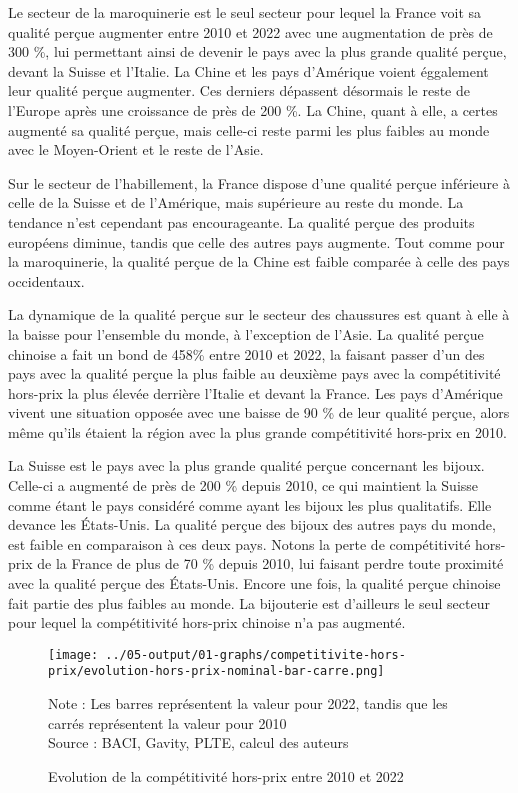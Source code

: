 \documentclass[french,10pt,a4paper]{article}
\begin{document}
Le secteur de la maroquinerie est le seul secteur pour lequel la France voit sa qualité perçue augmenter entre 2010 et 2022 avec une augmentation de près de 300 \%, lui permettant ainsi de devenir le pays avec la plus grande qualité perçue, devant la Suisse et l'Italie. La Chine et les pays d'Amérique voient éggalement leur qualité perçue augmenter. Ces derniers dépassent désormais le reste de l'Europe après une croissance de près de 200 \%. La Chine, quant à elle, a certes augmenté sa qualité perçue, mais celle-ci reste parmi les plus faibles au monde avec le Moyen-Orient et le reste de l'Asie.

Sur le secteur de l'habillement, la France dispose d'une qualité perçue inférieure à celle de la Suisse et de l'Amérique, mais supérieure au reste du monde. La tendance n'est cependant pas encourageante. La qualité perçue des produits européens diminue, tandis que celle des autres pays augmente. Tout comme pour la maroquinerie, la qualité perçue de la Chine est faible comparée à celle des pays occidentaux.

La dynamique de la qualité perçue sur le secteur des chaussures est quant à elle à la baisse pour l'ensemble du monde, à l'exception de l'Asie. La qualité perçue chinoise a fait un bond de 458\% entre 2010 et 2022, la faisant passer d'un des pays avec la qualité perçue la plus faible au deuxième pays avec la compétitivité hors-prix la plus élevée derrière l'Italie et devant la France. Les pays d'Amérique vivent une situation opposée avec une baisse de 90 \% de leur qualité perçue, alors même qu'ils étaient la région avec la plus grande compétitivité hors-prix en 2010.

La Suisse est le pays avec la plus grande qualité perçue concernant les bijoux. Celle-ci a augmenté de près de 200 \% depuis 2010, ce qui maintient la Suisse comme étant le pays considéré comme ayant les bijoux les plus qualitatifs. Elle devance les États-Unis. La qualité perçue des bijoux des autres pays du monde, est faible en comparaison à ces deux pays. Notons la perte de compétitivité hors-prix de la France de plus de 70 \% depuis 2010, lui faisant perdre toute proximité avec la qualité perçue des États-Unis. Encore une fois, la qualité perçue chinoise fait partie des plus faibles au monde. La bijouterie est d'ailleurs le seul secteur pour lequel la compétitivité hors-prix chinoise n'a pas augmenté. 

\begin{figure}[!h]
  \centering
  \texttt{[image: ../05-output/01-graphs/competitivite-hors-prix/evolution-hors-prix-nominal-bar-carre.png]}
  \captionsetup{justification=justified, singlelinecheck=false, font=small}
  \caption*{Note : Les barres représentent la valeur pour 2022, tandis que les carrés représentent la valeur pour 2010 \\
  Source : BACI, Gavity, PLTE, calcul des auteurs}
  \captionsetup{justification=centering, singlelinecheck=true, font=normalsize}
  \caption{Evolution de la compétitivité hors-prix entre 2010 et 2022}
  \label{fig:hors-prix}
\end{figure}
\end{document}
